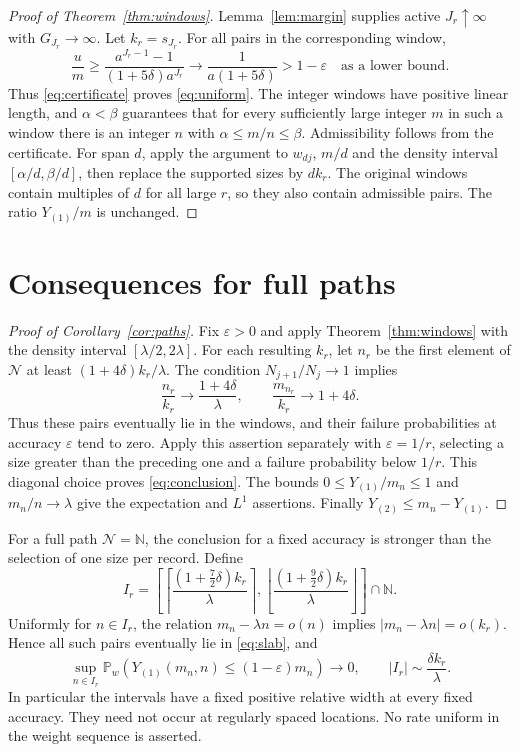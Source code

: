 \documentclass[11pt]{amsart}
\theoremstyle{remark}\newtheorem{remark}[theorem]{Remark}
\newcommand{\Pp}{\mathbb P}
\newcommand{\N}{\mathbb N}
\begin{document}
\begin{proof}[Proof of Theorem~\ref{thm:windows}]
Lemma~\ref{lem:margin} supplies active $J_r\uparrow\infty$ with
$G_{J_r}\to\infty$. Let $k_r=s_{J_r}$. For all pairs in the corresponding
window,
\[
 \frac{u}{m}\ge\frac{a^{J_r-1}-1}{(1+5\delta)a^{J_r}}
 \longrightarrow\frac1{a(1+5\delta)}>1-\varepsilon
 \quad\text{as a lower bound}.
\]
Thus \eqref{eq:certificate} proves \eqref{eq:uniform}. The integer windows
have positive linear length, and $\alpha<\beta$ guarantees that for every
sufficiently large integer $m$ in such a window there is an integer $n$
with $\alpha\le m/n\le\beta$. Admissibility follows from the certificate.
For span $d$, apply the argument to $w_{dj}$, $m/d$ and the density interval
$[\alpha/d,\beta/d]$, then replace the supported sizes by $d k_r$.
The original windows contain multiples of $d$ for all large $r$, so they
also contain admissible pairs. The ratio $Y_{(1)}/m$ is unchanged.
\end{proof}

\section{Consequences for full paths}\label{sec:paths}
\begin{proof}[Proof of Corollary~\ref{cor:paths}]
Fix $\varepsilon>0$ and apply Theorem~\ref{thm:windows} with the density
interval $[\lambda/2,2\lambda]$. For each resulting $k_r$, let $n_r$ be the
first element of $\mathcal N$ at least $(1+4\delta)k_r/\lambda$.
The condition $N_{j+1}/N_j\to1$ implies
\[
 \frac{n_r}{k_r}\to\frac{1+4\delta}{\lambda},\qquad
 \frac{m_{n_r}}{k_r}\to1+4\delta.
\]
Thus these pairs eventually lie in the windows, and their failure
probabilities at accuracy $\varepsilon$ tend to zero. Apply this assertion
separately with $\varepsilon=1/r$, selecting a size greater than the preceding
one and a failure probability below $1/r$. This diagonal choice proves
\eqref{eq:conclusion}. The bounds $0\le Y_{(1)}/m_n\le1$ and
$m_n/n\to\lambda$ give the expectation and $L^1$ assertions. Finally
$Y_{(2)}\le m_n-Y_{(1)}$.
\end{proof}

For a full path $\mathcal N=\N$, the conclusion for a fixed accuracy is
stronger than the selection of one size per record. Define
\begin{equation}\label{eq:sizeintervals}
 I_r=\left[
 \left\lceil\frac{(1+\tfrac72\delta)k_r}{\lambda}\right\rceil,
 \left\lfloor\frac{(1+\tfrac92\delta)k_r}{\lambda}\right\rfloor
 \right]\cap\N.
\end{equation}
Uniformly for $n\in I_r$, the relation $m_n-\lambda n=o(n)$ implies
$|m_n-\lambda n|=o(k_r)$. Hence all such pairs eventually lie in
\eqref{eq:slab}, and
\begin{equation}\label{eq:blocks}
 \sup_{n\in I_r}\Pp_w(Y_{(1)}(m_n,n)\le(1-\varepsilon)m_n)\to0,
 \qquad |I_r|\sim\frac{\delta k_r}{\lambda}.
\end{equation}
In particular the intervals have a fixed positive relative width at every
fixed accuracy. They need not occur at regularly spaced locations.
No rate uniform in the weight sequence is asserted.
\end{document}
